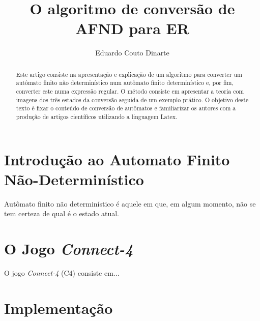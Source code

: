 \documentclass[a4paper,10pt]{article} %
\title{O algoritmo de conversão de AFND para ER}
\author{Eduardo Couto Dinarte}
\begin{document}
\maketitle

\begin{abstract}

    Este artigo consiste na apresenta\c{c}\~{a}o e explica\c{c}\~{a}o de um algoritmo para converter um aut\^{o}mato finito n\~{a}o determin\'{i}stico num aut\^{o}mato finito determin\'{i}stico e, por fim, converter este numa express\~{a}o regular. O m\'{e}todo consiste em apresentar a teoria com imagens dos tr\^{e}s estados da convers\~{a}o seguida de um exemplo pr\'{a}tico. O objetivo deste texto \'{e} fixar o conte\'{u}do de convers\~{a}o de aut\^{o}matos e familiarizar os autores com a produ\c{c}\~{a}o de artigos cient\'{i}ficos utilizando a linguagem Latex.

\end{abstract}


\section{Introdução ao Automato Finito Não-Determinístico}

    Aut\^{o}mato finito n\~{a}o determin\'{i}stico \'{e} aquele em que, em algum momento, n\~{a}o se tem certeza de qual \'{e} o estado atual.

\begin{center}
\end{center}


\section{O Jogo \textit{Connect-4}}

O jogo \textit{Connect-4} (C4) consiste em...

\section{Implementação}
\end{document}
